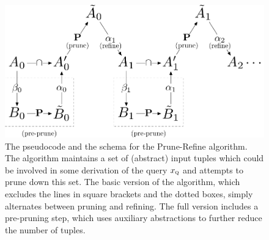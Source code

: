 \begin{figure}[t]
\begin{center}  \end{center} %
\includegraphics[scale=0.5]{figures/algorithm}
\caption{\label{fig:pseudocode} The pseudocode and the schema for the Prune-Refine algorithm.
The algorithm maintains a set of (abstract) input tuples which could be
involved in some derivation of the query $x_\text{\sc q}$ and attempts to prune down this set.
The basic version of the algorithm, which excludes the lines in square brackets and the dotted boxes,
simply alternates between pruning and refining.  The full version includes
a pre-pruning step, which uses auxiliary abstractions to further reduce the
number of tuples.
}
\end{figure}

